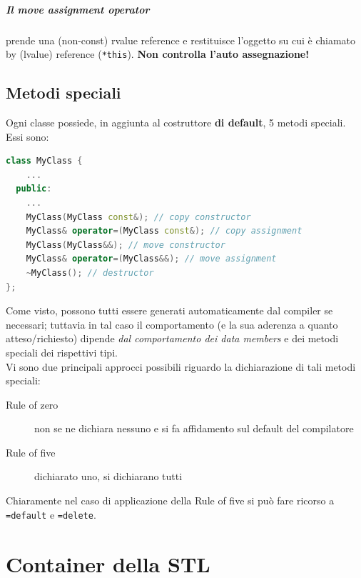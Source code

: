 \documentclass[10pt, oneside]{book}
\begin{document}
\paragraph{Il move assignment operator} prende una (non-const) rvalue reference e restituisce l'oggetto su cui è chiamato by (lvalue) reference (\texttt{*this}). \textbf{Non controlla l'auto assegnazione!}

\section{Metodi speciali}
Ogni classe possiede, in aggiunta al costruttore \textbf{di default}, 5 metodi speciali. Essi sono:
\begin{lstlisting}[language=C++]
class MyClass {
    ...
  public:
    ...
    MyClass(MyClass const&); // copy constructor
    MyClass& operator=(MyClass const&); // copy assignment
    MyClass(MyClass&&); // move constructor
    MyClass& operator=(MyClass&&); // move assignment
    ~MyClass(); // destructor
};
\end{lstlisting}

Come visto, possono tutti essere generati automaticamente dal compiler se necessari; tuttavia in tal caso il comportamento (e la sua aderenza a quanto atteso/richiesto) dipende \textit{dal comportamento dei data members} e dei metodi speciali dei rispettivi tipi.\\
Vi sono due principali approcci possibili riguardo la dichiarazione di tali metodi speciali:
\begin{description}
\item[Rule of zero] non se ne dichiara nessuno e si fa affidamento sul default del compilatore
\item[Rule of five] dichiarato uno, si dichiarano tutti
\end{description}
Chiaramente nel caso di applicazione della Rule of five si può fare ricorso a \texttt{=default} e \texttt{=delete}.

\chapter{Container della STL}
\end{document}
